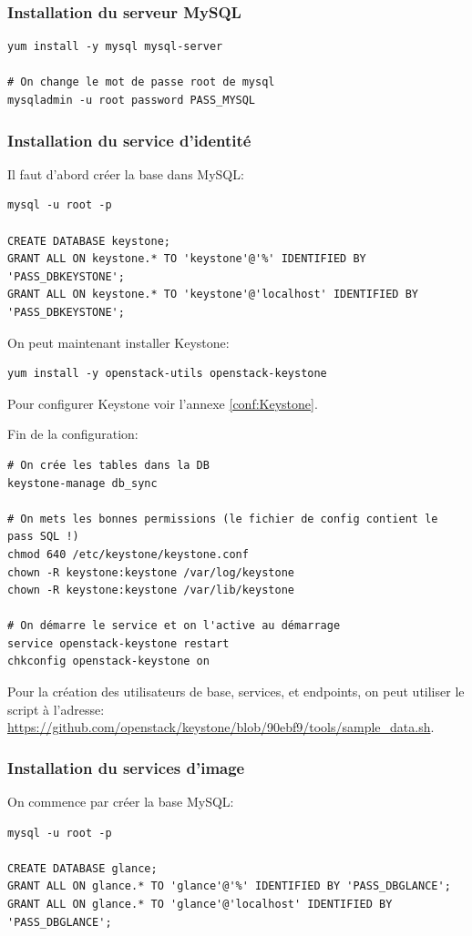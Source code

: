 \documentclass[a4paper,oneside]{report}
\begin{document}
\subsubsection{Installation du serveur MySQL}
\begin{verbatim}
yum install -y mysql mysql-server

# On change le mot de passe root de mysql
mysqladmin -u root password PASS_MYSQL
\end{verbatim}
\subsubsection{Installation du service d'identité}
Il faut d'abord créer la base dans MySQL:
\begin{verbatim}
mysql -u root -p

CREATE DATABASE keystone;
GRANT ALL ON keystone.* TO 'keystone'@'%' IDENTIFIED BY 'PASS_DBKEYSTONE';
GRANT ALL ON keystone.* TO 'keystone'@'localhost' IDENTIFIED BY 'PASS_DBKEYSTONE';
\end{verbatim}

On peut maintenant installer Keystone:
\begin{verbatim}
yum install -y openstack-utils openstack-keystone
\end{verbatim}

Pour configurer Keystone voir l'annexe \ref{conf:Keystone}.

Fin de la configuration:
\begin{verbatim} 
# On crée les tables dans la DB
keystone-manage db_sync

# On mets les bonnes permissions (le fichier de config contient le pass SQL !)
chmod 640 /etc/keystone/keystone.conf 
chown -R keystone:keystone /var/log/keystone
chown -R keystone:keystone /var/lib/keystone

# On démarre le service et on l'active au démarrage
service openstack-keystone restart
chkconfig openstack-keystone on
\end{verbatim}

\noindent Pour la création des utilisateurs de base, services, et endpoints, on peut utiliser le script à l'adresse: \url{https://github.com/openstack/keystone/blob/90ebf9/tools/sample_data.sh}.

\subsubsection{Installation du services d'image}
\noindent On commence par créer la base MySQL:
\begin{verbatim}
mysql -u root -p

CREATE DATABASE glance;
GRANT ALL ON glance.* TO 'glance'@'%' IDENTIFIED BY 'PASS_DBGLANCE';
GRANT ALL ON glance.* TO 'glance'@'localhost' IDENTIFIED BY 'PASS_DBGLANCE';
\end{verbatim}
\end{document}
